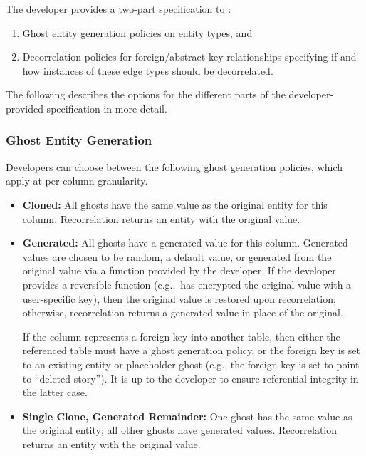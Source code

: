 The developer provides a two-part specification to \sys{}: 
\begin{enumerate}
    \item Ghost entity generation policies on entity types, and
    \item Decorrelation policies for foreign/abstract key relationships specifying if and how
        instances of these edge types should be decorrelated.
\end{enumerate}

\noindent The following describes the options for the different parts of the developer-provided
specification in more detail.

\subsubsection{Ghost Entity Generation}
Developers can choose between the following ghost generation policies, which apply at 
per-column granularity.
\begin{itemize}
    \item \textbf{Cloned:} All ghosts have the same value as the original entity for this column.
        Recorrelation returns an entity with the original value.

    \item \textbf{Generated:} All ghosts have a generated value for this column. Generated values are
chosen to be random, a default value, or generated from the original value via a function provided by the developer.
        If the developer provides a reversible function (e.g.,\ has encrypted the original value
        with a user-specific key), then the original value is restored upon
        recorrelation; otherwise, recorrelation returns a generated value in place of the original.

        If the column represents a foreign key into another table, then either the referenced table must 
        have a ghost generation policy, or the foreign key is set to an existing entity or placeholder ghost (e.g.,
        the foreign key is set to point to ``deleted story''). It is up to the developer to ensure
        referential integrity in the latter case.

\item \textbf{Single Clone, Generated Remainder:} One ghost has the same value as the original
        entity; all other ghosts have generated values. Recorrelation returns an entity with the original value.
\end{itemize}



